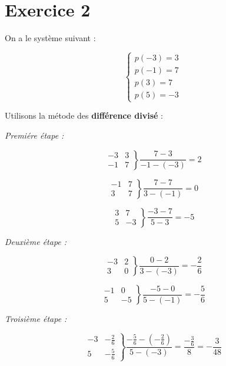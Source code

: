 \documentclass[12pt, letterpaper]{article}
\begin{document}
\section*{Exercice 2}

On a le système suivant :

$$
\left\{
\begin{array}{l}
  p(-3) = 3 \\
  p(-1) = 7 \\
  p(3) = 7 \\
  p(5) = -3
\end{array}
\right.
$$

Utilisons la métode des \textbf{différence divisé} :

\textit{Premiére étape :}

$$
\left.
\begin{array}{ll}
   
  -3 & 3 \\
  -1 & 7
\end{array}
\right\}
\frac{7 - 3}{-1 - (-3)} = 2
$$

$$
\left.
\begin{array}{ll}
   
  -1 & 7 \\
  3 & 7
\end{array}
\right\}
\frac{7 - 7}{3 - (-1)} = 0
$$

$$
\left.
\begin{array}{ll}
   
  3 & 7 \\
  5 & -3
\end{array}
\right\}
\frac{-3 - 7}{5 - 3} = -5
$$

\textit{Deuxième étape :}

$$
\left.
\begin{array}{ll}
   
  -3 & 2 \\
  3 & 0
\end{array}
\right\}
\frac{0 - 2}{3 -(- 3)} = -\frac{2}{6}
$$

$$
\left.
\begin{array}{ll}
   
  -1 & 0 \\
  5 & -5
\end{array}
\right\}
\frac{-5 - 0}{5 -(- 1)} = -\frac{5}{6}
$$

\textit{Troisième étape :}

$$
\left.
\begin{array}{ll}
   
  -3 & -\frac{2}{6} \\
  5 & -\frac{5}{6}
\end{array}
\right\}
\frac{-\frac{5}{6} - (-\frac{2}{6})}{5 -(- 3)} =
\frac{-\frac{3}{6}}{8} = -\frac{3}{48}
$$
\end{document}

